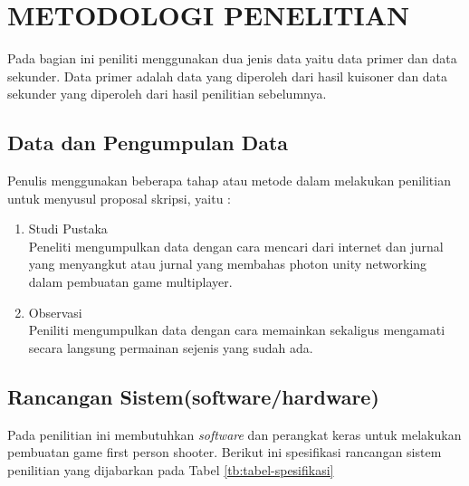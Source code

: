 \chapter{METODOLOGI PENELITIAN}
\noindent

Pada bagian ini peniliti menggunakan dua jenis data yaitu data primer dan data sekunder. Data primer adalah data yang diperoleh dari hasil kuisoner dan data sekunder yang diperoleh dari hasil penilitian sebelumnya.

\section{Data dan Pengumpulan Data}
\noindent

Penulis menggunakan beberapa tahap atau metode dalam melakukan penilitian untuk menyusul proposal skripsi, yaitu :

\begin{enumerate}
    \item Studi Pustaka \\ Peneliti mengumpulkan data dengan cara mencari dari internet dan jurnal yang menyangkut atau jurnal yang membahas photon unity networking dalam pembuatan game multiplayer.
    \item Observasi \\ Peniliti mengumpulkan data dengan cara memainkan sekaligus mengamati secara langsung permainan sejenis yang sudah ada.
\end{enumerate}

\section{Rancangan Sistem(software/hardware)}
\noindent

    Pada penilitian ini membutuhkan \textit{software} dan perangkat keras untuk melakukan pembuatan game first person shooter. Berikut ini spesifikasi rancangan sistem penilitian yang dijabarkan pada Tabel \ref{tb:tabel-spesifikasi}
    
